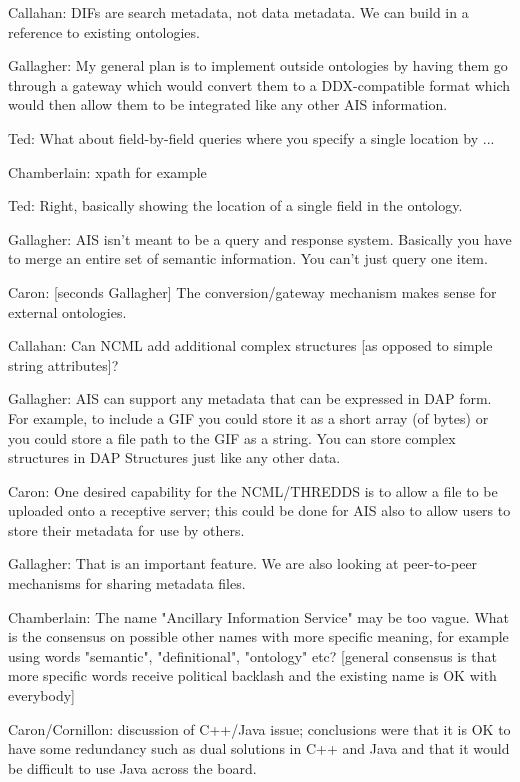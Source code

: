 Callahan: DIFs are search metadata, not data metadata. We can build in a
reference to existing ontologies.

Gallagher: My general plan is to implement outside ontologies by having
them go through a gateway which would convert them to a DDX-compatible
format which would then allow them to be integrated like any other AIS
information.

Ted: What about field-by-field queries where you specify a single
location by ...

Chamberlain:  xpath for example

Ted: Right, basically showing the location of a single field in the
ontology.

Gallagher: AIS isn't meant to be a query and response system. Basically
you have to merge an entire set of semantic information. You can't just
query one item.

Caron: [seconds Gallagher] The conversion/gateway mechanism makes sense
for external ontologies.

Callahan: Can NCML add additional complex structures [as opposed to
simple string attributes]?

Gallagher: AIS can support any metadata that can be expressed in DAP
form. For example, to include a GIF you could store it as a short array
(of bytes) or you could store a file path to the GIF as a string. You
can store complex structures in DAP Structures just like any other data.

Caron: One desired capability for the NCML/THREDDS is to allow a file to
be uploaded onto a receptive server; this could be done for AIS also to
allow users to store their metadata for use by others.

Gallagher: That is an important feature. We are also looking at
peer-to-peer mechanisms for sharing metadata files.

Chamberlain: The name "Ancillary Information Service" may be too vague.
What is the consensus on possible other names with more specific
meaning, for example using words "semantic", "definitional", "ontology"
etc? [general consensus is that more specific words receive political
backlash and the existing name is OK with everybody]

Caron/Cornillon:  discussion of C++/Java issue; conclusions were that it
is OK to have some redundancy such as dual solutions in C++ and Java and
that it would be difficult to use Java across the board.


